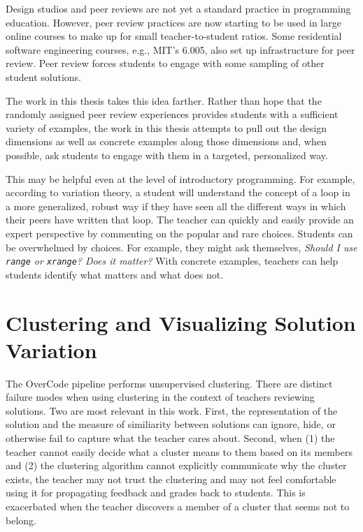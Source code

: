 Design studios and peer reviews are not yet a standard practice in programming education. However, peer review practices are now starting to be used in large online courses to make up for small teacher-to-student ratios. Some residential software engineering courses, e.g., MIT's 6.005, also set up infrastructure for peer review. Peer review forces students to engage with some sampling of other student solutions. 

The work in this thesis takes this idea farther. Rather than hope that the randomly assigned peer review experiences provides students with a sufficient variety of examples, the work in this thesis attempts to pull out the design dimensions as well as concrete examples along those dimensions and, when possible, ask students to engage with them in a targeted, personalized way. 

This may be helpful even at the level of introductory programming. For example, according to variation theory, a student will understand the concept of a loop in a more generalized, robust way if they have seen all the different ways in which their peers have written that loop. The teacher can quickly and easily provide an expert perspective by commenting on the popular and rare choices. Students can be overwhelmed by choices. For example, they might ask themselves, {\it Should I use \texttt{range} or \texttt{xrange}? Does it matter?} With concrete examples, teachers can help students identify what matters and what does not. 



\section{Clustering and Visualizing Solution Variation}
The OverCode pipeline performs unsupervised clustering. There are distinct failure modes when using clustering in the context of teachers reviewing solutions. Two are most relevant in this work. First, the representation of the solution and the measure of similiarity between solutions can ignore, hide, or otherwise fail to capture what the teacher cares about. Second, when (1) the teacher cannot easily decide what a cluster means to them based on its members and (2) the clustering algorithm cannot explicitly communicate why the cluster exists, the teacher may not trust the clustering and may not feel comfortable using it for propagating feedback and grades back to students. This is exacerbated when the teacher discovers a member of a cluster that seems not to belong.

